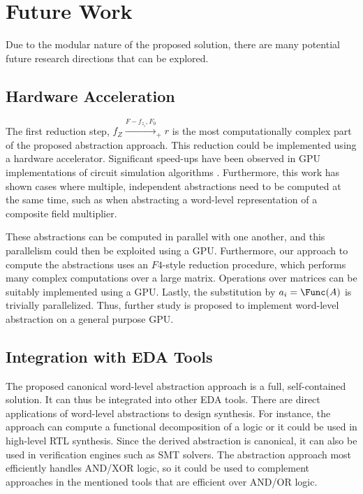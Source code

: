 \section{Future Work}

Due to the modular nature of the proposed solution, there are many
potential future research directions that can be explored.

\subsection{Hardware Acceleration}
The first reduction step, $f_Z\xrightarrow{F-f_{z_i},F_0}_+ r$
is the most computationally complex part of the proposed abstraction approach. This
reduction could be implemented using a hardware accelerator.
Significant speed-ups have 
been observed in GPU implementations of circuit simulation algorithms 
\cite{PengLi:GPU}. 
Furthermore, this work has shown cases where multiple, independent abstractions 
need to be computed at the same time, such as when abstracting a word-level 
representation of a composite field multiplier.

These abstractions can be computed in parallel with one another, and this
parallelism could then be exploited using a GPU. Furthermore, our 
approach to compute the abstractions uses an $F4$-style reduction procedure, 
which performs many complex computations over a large matrix. 
Operations over matrices can be suitably implemented using a GPU.
Lastly, the substitution by $a_i=\Func(A)$ is trivially parallelized. 
Thus, further study is proposed to implement word-level abstraction 
on a general purpose GPU.

\subsection{Integration with EDA Tools} 
The proposed canonical word-level abstraction approach is a full, 
self-contained solution.
It can thus be integrated into other EDA tools. There are direct
applications of word-level abstractions to design synthesis. For instance, 
the approach can compute a functional decomposition of a logic or it could 
be used in high-level RTL synthesis. Since the derived abstraction 
is canonical, it can also be used in verification engines such as SMT solvers.
The abstraction approach most efficiently handles AND/XOR logic, so it
could be used to complement approaches in the mentioned tools that are
efficient over AND/OR logic.

